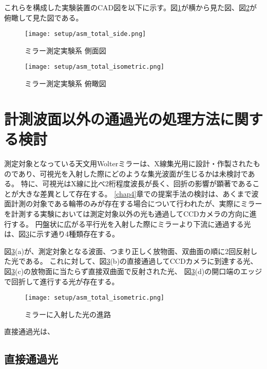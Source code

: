 これらを構成した実験装置のCAD図を以下に示す。図\ref{fig:mirror_experiment_asm_cad_side}が横から見た図、図\ref{fig:mirror_experiment_asm_cad_isometric}が俯瞰して見た図である。

\begin{figure}[!ht]
\centering
\texttt{[image: setup/asm\_total\_side.png]}
\caption{ミラー測定実験系 側面図}
\label{fig:mirror_experiment_asm_cad_side}
\end{figure}

\begin{figure}[!ht]
\centering
\texttt{[image: setup/asm\_total\_isometric.png]}
\caption{ミラー測定実験系 俯瞰図}
\label{fig:mirror_experiment_asm_cad_isometric}
\end{figure}

\clearpage

\newpage

\section{計測波面以外の通過光の処理方法に関する検討}
測定対象となっている天文用Wolterミラーは、X線集光用に設計・作製されたものであり、可視光を入射した際にどのような集光波面が生じるかは未検討である。
特に、可視光はX線に比べ2桁程度波長が長く、回折の影響が顕著であることが大きな差異として存在する。
\ref{chap4}章での提案手法の検討は、あくまで波面計測の対象である輪帯のみが存在する場合について行われたが、実際にミラーを計測する実験においては測定対象以外の光も通過してCCDカメラの方向に進行する。
円盤状に広がる平行光を入射した際にミラーより下流に通過する光は、図\ref{fig:mirror_beam_path_types}に示す通り4種類存在する。

図\ref{fig:mirror_beam_path_types}(a)が、測定対象となる波面、つまり正しく放物面、双曲面の順に2回反射した光である。
これに対して、図\ref{fig:mirror_beam_path_types}(b)の直接通過してCCDカメラに到達する光、
図\ref{fig:mirror_beam_path_types}(c)の放物面に当たらず直接双曲面で反射された光、
図\ref{fig:mirror_beam_path_types}(d)の開口端のエッジで回折して進行する光が存在する。

\begin{figure}[!ht]
\centering
\texttt{[image: setup/asm\_total\_isometric.png]}
\caption{ミラーに入射した光の進路}
\label{fig:mirror_beam_path_types}
\end{figure}

直接通過光は、
\subsection{直接通過光}



